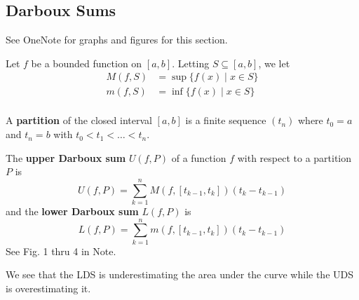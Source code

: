 \documentclass{article}
\begin{document}
\subsection{Darboux Sums}
\begin{remark}
  See OneNote for graphs and figures for this section.
\end{remark}
\begin{definition}
  Let $f$ be a bounded function on $[a, b]$. Letting $S \subseteq [a, b]$, we let
  \begin{align*}
    M(f, S) &= \sup \{f(x) \mid x \in S\}\\
    m(f, S) &= \inf \{f(x) \mid x \in S\}\\
  \end{align*}
\end{definition}
\begin{definition}
  A \textbf{partition} of the closed interval $[a, b]$ is a finite sequence $(t_n)$ where $t_0 = a$ and $t_n = b$ with $t_0 < t_1 < \ldots < t_n$.
\end{definition}
\begin{definition}
  The \textbf{upper Darboux sum} $U(f, P)$ of a function $f$ with respect to a partition $P$ is \[
    U(f, P) = \sum_{k=1}^n M(f, [t_{k-1}, t_k])(t_k - t_{k-1})
  \] and the \textbf{lower Darboux sum} $L(f, P)$ is \[
    L(f, P) = \sum_{k=1}^n m(f, [t_{k-1}, t_k])(t_k - t_{k-1})
  \]
  See Fig. 1 thru 4 in Note.
\end{definition}
\begin{remark}
  We see that the LDS is underestimating the area under the curve while the UDS is overestimating it.
\end{remark}
\end{document}
